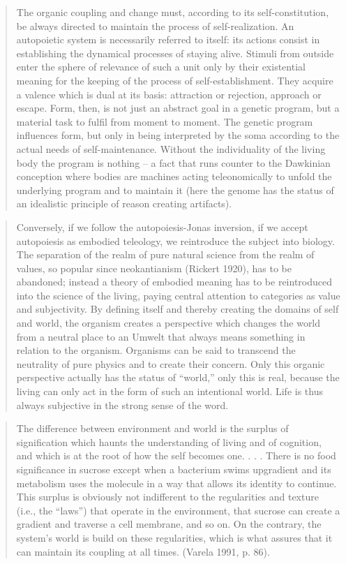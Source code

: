 \documentclass[a4paper,12pt,twoside,leqno]{article}
\begin{document}
\begin{quote}
The organic coupling and change must, according to its self-constitution,
be always directed to maintain the process of self-realization. An autopoietic
system is necessarily referred to itself: its actions consist in establishing the
dynamical processes of staying alive. Stimuli from outside enter the sphere
of relevance of such a unit only by their existential meaning for the keeping
of the process of self-establishment. They acquire a valence which is dual at
its basis: attraction or rejection, approach or escape. Form, then, is not just an
abstract goal in a genetic program, but a material task to fulfil from moment
to moment. The genetic program influences form, but only in being interpreted
by the soma according to the actual needs of self-maintenance. Without the
individuality of the living body the program is nothing – a fact that runs counter
to the Dawkinian conception where bodies are machines acting teleonomically
to unfold the underlying program and to maintain it (here the genome has the
status of an idealistic principle of reason creating artifacts).
\end{quote}
\begin{quote}
Conversely, if we follow the autopoiesis-Jonas inversion, if we accept
autopoiesis as embodied teleology, we reintroduce the subject into biology.
The separation of the realm of pure natural science from the realm of values,
so popular since neokantianism (Rickert 1920), has to be abandoned; instead
a theory of embodied meaning has to be reintroduced into the science of the
living, paying central attention to categories as value and subjectivity. By
defining itself and thereby creating the domains of self and world, the organism creates a perspective which changes the world from a neutral place to an
Umwelt that always means something in relation to the organism. Organisms
can be said to transcend the neutrality of pure physics and to create their concern. Only this organic perspective actually has the status of “world,” only
this is real, because the living can only act in the form of such an intentional
world. Life is thus always subjective in the strong sense of the word.
\end{quote}
\begin{quote}
The difference between environment and world is the surplus of signification which haunts
the understanding of living and of cognition, and which is at the root of how the self becomes one. . . . There is no food significance in sucrose except when a bacterium swims
upgradient and its metabolism uses the molecule in a way that allows its identity to continue. This surplus is obviously not indifferent to the regularities and texture (i.e., the
“laws”) that operate in the environment, that sucrose can create a gradient and traverse a
cell membrane, and so on. On the contrary, the system’s world is build on these regularities,
which is what assures that it can maintain its coupling at all times. (Varela 1991, p. 86).
\end{quote}
\end{document}
